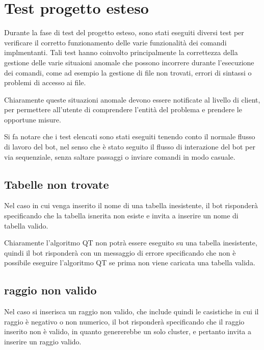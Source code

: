 \section{Test progetto esteso}

Durante la fase di test del progetto esteso, sono stati eseguiti diversi test per verificare il corretto funzionamento delle varie funzionalità dei comandi implmentanti. 
Tali test hanno coinvolto principalmente la correttezza della gestione delle varie situaioni anomale che possono incorrere durante l'esecuzione dei comandi, come ad esempio la gestione di file non trovati, errori di sintassi o problemi di accesso ai file.

Chiaramente queste situazioni anomale devono essere notificate al livello di client, per permettere all'utente di comprendere l'entità del problema e prendere le opportune misure.

Si fa notare che i test elencati sono stati eseguiti tenendo conto il normale flusso di lavoro del bot, nel senso che è stato seguito il flusso di interazione del bot per via sequenziale, senza saltare passaggi o inviare comandi in modo casuale.

\subsection{Tabelle non trovate}

Nel caso in cui venga inserito il nome di una tabella inesistente, il bot risponderà specificando che  la tabella isnerita non esiste e invita a inserire un nome di tabella valido.


Chiaramente l'algoritmo QT non potrà essere eseguito su una tabella inesistente, quindi il bot risponderà con un messaggio di errore specificando che non è possibile eseguire l'algoritmo QT se prima non viene caricata una tabella valida.


\subsection{raggio non valido}

Nel caso si inserisca un raggio non valido, che include quindi le casistiche in cui il raggio è negativo o non numerico, il bot risponderà specificando che il raggio inserito non è valido, in quanto genererebbe un solo cluster, e pertanto  invita a inserire un raggio valido.

